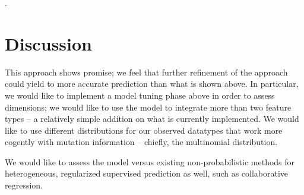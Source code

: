 .


\section{Discussion}

This approach shows promise; we feel that further refinement of the approach could yield to more accurate prediction than what is shown above. In particular, we would like to implement a model tuning phase above in order to assess dimensions; we would like to use the model to integrate more than two feature types -- a relatively simple addition on what is currently implemented. We would like to use different distributions for our observed datatypes that work more cogently with mutation information -- chiefly, the multinomial distribution.

We would like to assess the model versus existing non-probabilistic methods for heterogeneous, regularized supervised prediction as well, such as collaborative regression. 
